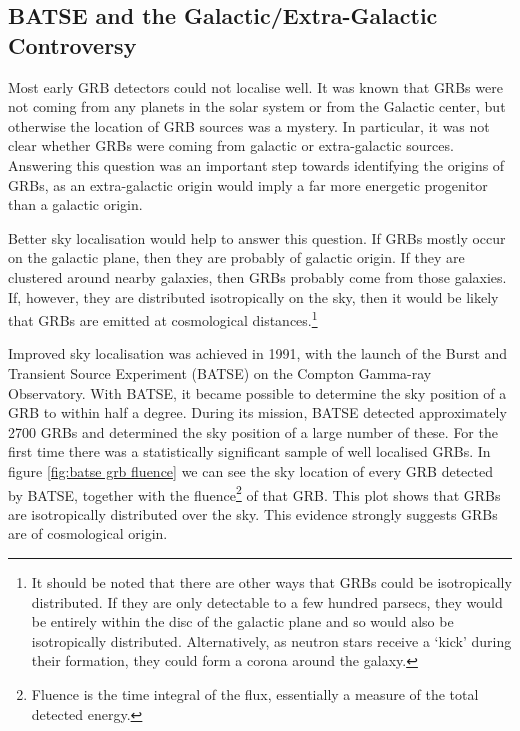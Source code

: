 \documentclass[11pt]{cuthesis}
\begin{document}
\subsection{BATSE and the Galactic/Extra-Galactic Controversy}
Most early GRB detectors could not localise well. It was known that GRBs were not coming from any planets in the solar system or from the Galactic center, but otherwise the location of GRB sources was a mystery. In particular, it was not clear whether GRBs were coming from galactic or extra-galactic sources. Answering this question was an important step towards identifying the origins of GRBs, as an extra-galactic origin would imply a far more energetic progenitor than a galactic origin. 

Better sky localisation would help to answer this question. If GRBs mostly occur on the galactic plane, then they are probably of galactic origin. If they are clustered around nearby galaxies, then GRBs probably come from those galaxies. If, however, they are distributed isotropically on the sky, then it would be likely that GRBs are emitted at cosmological distances.\footnote{It should be noted that there are other ways that GRBs could be isotropically distributed. If they are only detectable to a few hundred parsecs, they would be entirely within the disc of the galactic plane and so would also be isotropically distributed. Alternatively, as neutron stars receive a `kick' during their formation, they could form a corona around the galaxy.}

Improved sky localisation was achieved in 1991, with the launch of the Burst and Transient Source Experiment (BATSE) on the Compton Gamma-ray Observatory. With BATSE, it became possible to determine the sky position of a GRB to within half a degree. During its mission, BATSE detected approximately 2700 GRBs and determined the sky position of a large number of these. For the first time there was a statistically significant sample of well localised GRBs. In figure \ref{fig:batse grb fluence} we can see the sky location of every GRB detected by BATSE, together with the fluence\footnote{Fluence is the time integral of the flux, essentially a measure of the total detected energy.} of that GRB. This plot shows that GRBs are isotropically distributed over the sky. This evidence strongly suggests GRBs are of cosmological origin. 
\end{document}
